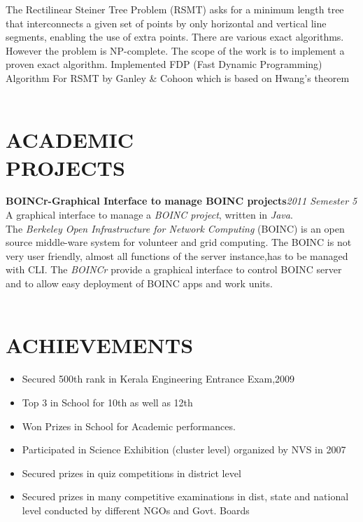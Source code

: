 \documentclass[line,margin]{res}
\begin{document}
\begin{resume}
           The Rectilinear Steiner Tree Problem (RSMT) asks for a minimum length tree that interconnects a given set of points by only horizontal and vertical line segments, enabling the use of extra points. There are various exact algorithms. However the problem is NP-complete. The scope of the work is to implement a proven exact algorithm. Implemented FDP (Fast Dynamic Programming) Algorithm For RSMT by Ganley \& Cohoon which is based on Hwang’s theorem\\\\

    \section{ACADEMIC \\ PROJECTS}
            {\bf BOINCr-Graphical Interface to manage BOINC projects}\hfill {\it 2011 Semester 5}\\
          
            A graphical interface to manage a {\it BOINC project}, written in {\it Java}.\\
            The {\it Berkeley Open Infrastructure for Network Computing }(BOINC) is an open source middle-ware system for volunteer and grid computing. The BOINC is not very user friendly, almost all functions of the server instance,has to be managed with CLI. The {\it BOINCr} provide a graphical interface to control BOINC server and to allow easy deployment of BOINC apps and work units.\\\\

    \section{ACHIEVEMENTS}
    \begin{itemize} \itemsep -2pt
    \item Secured 500th rank in Kerala Engineering Entrance Exam,2009
    \item Top 3 in School for 10th as well as 12th
    \item Won Prizes in School for Academic performances.
    \item Participated in Science Exhibition (cluster level) organized by NVS in 2007
    \item Secured prizes in quiz competitions in district level
    \item Secured prizes in many competitive examinations in dist, state and national level conducted by different NGOs and Govt. Boards
    \end{itemize}\\\\

\end{resume}
\end{document}
